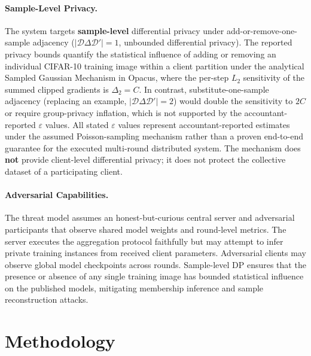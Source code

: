 \documentclass[11pt,a4paper]{article}
\begin{document}
\paragraph{Sample-Level Privacy.}
The system targets \textbf{sample-level} differential privacy under add-or-remove-one-sample adjacency ($|\mathcal{D} \Delta \mathcal{D}'| = 1$, unbounded differential privacy). The reported privacy bounds quantify the statistical influence of adding or removing an individual CIFAR-10 training image within a client partition under the analytical Sampled Gaussian Mechanism in Opacus, where the per-step $L_2$ sensitivity of the summed clipped gradients is $\Delta_2 = C$. In contrast, substitute-one-sample adjacency (replacing an example, $|\mathcal{D} \Delta \mathcal{D}'| = 2$) would double the sensitivity to $2C$ or require group-privacy inflation, which is not supported by the accountant-reported $\varepsilon$ values. All stated $\varepsilon$ values represent accountant-reported estimates under the assumed Poisson-sampling mechanism rather than a proven end-to-end guarantee for the executed multi-round distributed system. The mechanism does \textbf{not} provide client-level differential privacy; it does not protect the collective dataset of a participating client.

\paragraph{Adversarial Capabilities.}
The threat model assumes an honest-but-curious central server and adversarial participants that observe shared model weights and round-level metrics. The server executes the aggregation protocol faithfully but may attempt to infer private training instances from received client parameters. Adversarial clients may observe global model checkpoints across rounds. Sample-level DP ensures that the presence or absence of any single training image has bounded statistical influence on the published models, mitigating membership inference and sample reconstruction attacks.

\section{Methodology}
\end{document}
